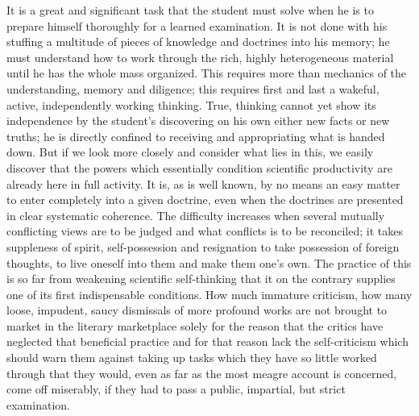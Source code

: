 \documentclass[12pt,a4paper,openany]{book}
\newcommand{\opage}[1]{\marginnote{\footnotesize\textit{[#1]}}}
\begin{document}
It is a great and significant task that the student
must solve when he is to prepare himself thoroughly
for a learned examination. It is not done with his
\setcounter{footnote}{0}%
\opage{302}stuffing a multitude of pieces of knowledge and doctrines into
his memory; he must understand how to work through the rich,
highly heterogeneous material until he has the whole mass
organized. This requires more than mechanics of the understanding,
memory and diligence; this requires first and last
a wakeful, active, independently working thinking.
True, thinking cannot yet show its independence
by the student's discovering on his own
either new facts or new truths; he is
directly confined to receiving and appropriating what is handed down.
But if we look more closely and consider
what lies in this, we easily discover that the powers which
essentially condition scientific productivity are already
here in full activity. It is, as is well known, by no means
an easy matter to enter completely into
a given doctrine, even when the doctrines are presented
in clear systematic coherence. The difficulty increases
when several mutually conflicting views are to be
judged and what conflicts is to be reconciled; it takes suppleness of spirit,
self-possession and resignation to take possession of
foreign thoughts, to live oneself into them and
make them one's own. The practice of this is so far from
weakening scientific self-thinking that it on the contrary
supplies one of its first indispensable conditions.
How much immature criticism, how many loose, impudent, saucy
dismissals of more profound works are not
brought to market in the literary marketplace solely for the reason
that the critics have neglected that beneficial practice and
for that reason lack the self-criticism which should warn them
against taking up tasks which they have so little worked through
that they would, even as far as the most meagre
\setcounter{footnote}{0}%
\opage{303}account is concerned, come off miserably, if
they had to pass a public, impartial, but strict
examination.
\end{document}
